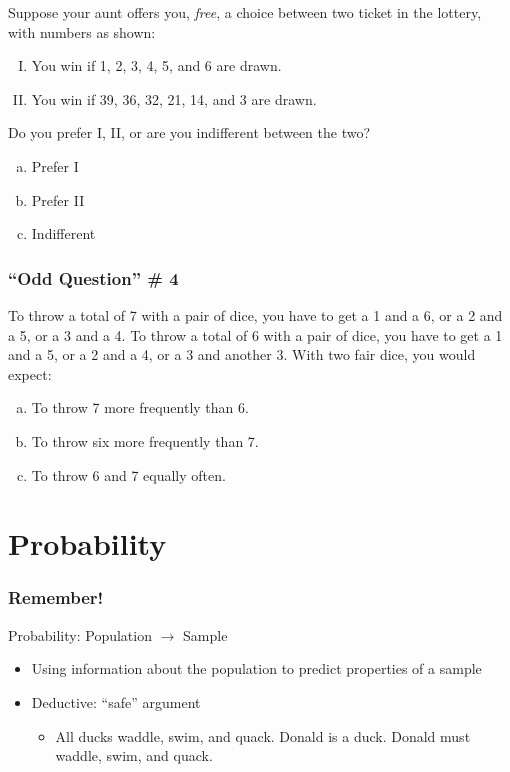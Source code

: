 \documentclass{beamer}
\begin{document}
\begin{singlespace}
\begin{frame}
	Suppose your aunt offers you, \emph{free}, a choice between two ticket in the lottery, with 
	numbers as shown:
	\begin{enumerate}[I.]
		\item You win if 1, 2, 3, 4, 5, and 6 are drawn.
		\item You win if 39, 36, 32, 21, 14, and 3 are drawn.
	\end{enumerate}
	\vspace{1em}
	Do you prefer I, II, or are you indifferent between the two?
	\begin{enumerate}[(a)]
		\item Prefer I
		\item Prefer II
		\item Indifferent
	\end{enumerate}
\end{frame}

\begin{frame}
\frametitle{``Odd Question'' \# 4}
    To throw a total of 7 with a pair of dice, you have to get a 1 and a 6, or a 2 and a 5, or a 3 and a 4.
    To throw a total of 6 with a pair of dice, you have to get a 1 and a 5, or a 2 and a 4, or a 3 and 
    another 3.
	\vspace{1em}
	With two fair dice, you would expect:
	\begin{enumerate}[(a)]
		\item To throw 7 more frequently than 6.
		\item To throw six more frequently than 7.
		\item To throw 6 and 7 equally often.
	\end{enumerate}
\end{frame}

\end{singlespace}

\section{Probability}
\begin{frame}
\frametitle{Remember!}
    Probability: Population $\rightarrow$ Sample
	\begin{itemize}
	    \item Using information about the population to predict properties of a sample
		\item Deductive: ``safe'' argument
		\begin{itemize}
        		\item All ducks waddle, swim, and quack. Donald is a duck. Donald must 								
		    waddle, swim, and quack.
		\end{itemize}
	\end{itemize}
\end{frame}
\end{document}
